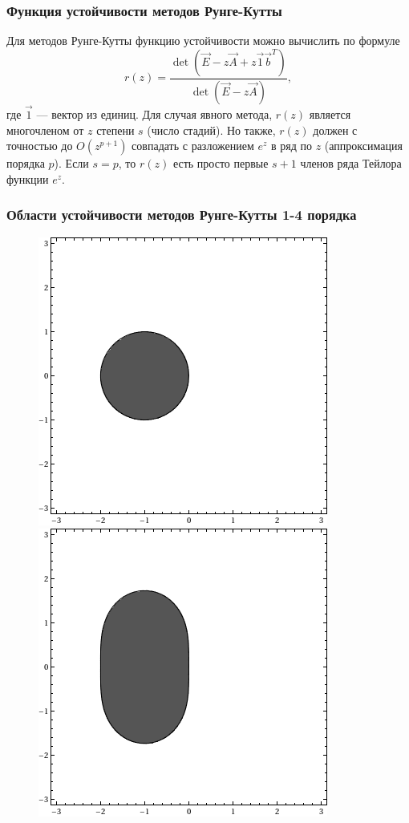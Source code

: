 \documentclass[professionalfonts,compress,unicode,aspectratio=169]{beamer}
\begin{document}
\begin{frame}\frametitle{Функция устойчивости методов Рунге-Кутты}
	Для методов Рунге-Кутты функцию устойчивости можно вычислить по формуле
	\[
	r(z) = \frac{\det(\vec E - z\vec A + z\vec 1\vec b^T)}{\det(\vec E - z\vec A)},
	\]
	где $\vec 1$ --- вектор из единиц.
	\pause
	Для случая явного метода, $r(z)$ является многочленом от $z$ степени $s$ (число стадий).
	Но также, $r(z)$ должен с точностью до $O(z^{p+1})$ совпадать с разложением $e^z$ в ряд по $z$ (аппроксимация порядка $p$).
	Если $s = p$, то $r(z)$ есть просто первые $s+1$ членов ряда Тейлора функции $e^z$.
\end{frame}

\begin{frame}\frametitle{Области устойчивости методов Рунге-Кутты 1-4 порядка}
\begin{figure}%
\includegraphics[height=.4\textheight]{rk1.png}%
\includegraphics[height=.4\textheight]{rk2.png}%


\end{figure}
\end{frame}
\end{document}
